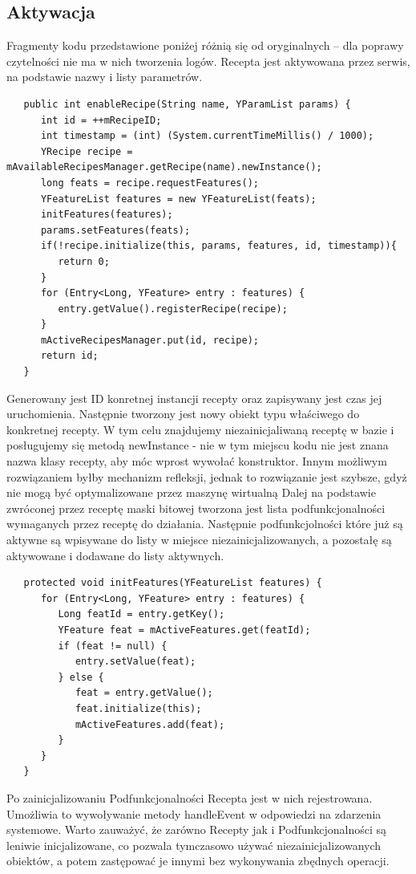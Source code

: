 \documentclass[11pt,a4paper,polish,thesis]{dcsbook}
\begin{document}
\subsection{Aktywacja}
Fragmenty kodu przedstawione poniżej różnią się od oryginalnych -- dla poprawy czytelności nie ma w nich tworzenia logów.
Recepta jest aktywowana przez serwis, na podstawie nazwy i listy parametrów.
\begin{verbatim}
   public int enableRecipe(String name, YParamList params) {
      int id = ++mRecipeID;
      int timestamp = (int) (System.currentTimeMillis() / 1000);
      YRecipe recipe = mAvailableRecipesManager.getRecipe(name).newInstance();
      long feats = recipe.requestFeatures();
      YFeatureList features = new YFeatureList(feats);
      initFeatures(features);
      params.setFeatures(feats);
      if(!recipe.initialize(this, params, features, id, timestamp)){
         return 0;
      }
      for (Entry<Long, YFeature> entry : features) {
         entry.getValue().registerRecipe(recipe);
      }
      mActiveRecipesManager.put(id, recipe);
      return id;
   }
\end{verbatim}
Generowany jest ID konretnej instancji recepty oraz zapisywany jest czas jej uruchomienia.
Następnie tworzony jest nowy obiekt typu właściwego do konkretnej recepty. W tym celu znajdujemy niezainicjaliwaną receptę w bazie i posługujemy się metodą newInstance - nie w tym miejscu kodu nie jest znana nazwa klasy recepty, aby móc wprost wywołać konstruktor. Innym możliwym rozwiązaniem byłby mechanizm refleksji, jednak to rozwiązanie jest szybsze, gdyż nie mogą być optymalizowane przez maszynę wirtualną \cite{java}
Dalej na podstawie zwróconej przez receptę maski bitowej tworzona jest lista podfunkcjonalności wymaganych przez receptę do działania. Następnie podfunkcjolności które już są aktywne są wpisywane do listy w miejsce niezainicjalizowanych, a pozostałę są aktywowane i dodawane do listy aktywnych.

\begin{verbatim}
   protected void initFeatures(YFeatureList features) {
      for (Entry<Long, YFeature> entry : features) {
         Long featId = entry.getKey();
         YFeature feat = mActiveFeatures.get(featId);
         if (feat != null) {
            entry.setValue(feat);
         } else {
            feat = entry.getValue();
            feat.initialize(this);
            mActiveFeatures.add(feat);
         }
      }
   }
\end{verbatim}
Po zainicjalizowaniu Podfunkcjonalności Recepta jest w nich rejestrowana. Umożliwia to wywoływanie metody handleEvent w odpowiedzi na zdarzenia systemowe. 
Warto zauważyć, że zarówno Recepty jak i Podfunkcjonalności są leniwie inicjalizowane, co pozwala tymczasowo używać niezainicjalizowanych obiektów, a potem zastępować je innymi bez wykonywania zbędnych operacji. 
\end{document}
